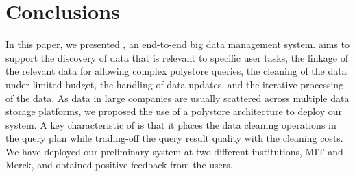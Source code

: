 \vspace{-.5em}

\section{Conclusions}
\label{sec:conclusion}

In this paper, we presented \dcv,  an end-to-end big data management system. 
\dcv aims to support  the discovery of data that is relevant to specific user tasks, 
the linkage of the relevant data for allowing complex polystore queries, 
the cleaning of the data under limited budget, 
the handling of  data updates, 
and the iterative processing of the data. 
As data in large companies are usually scattered across multiple
data storage platforms, we proposed the use of a polystore architecture to deploy our system.
A key characteristic of \dcv is that it places the data cleaning operations in the query plan
while  trading-off the query result quality with the cleaning costs. 
We have deployed our preliminary system at two different institutions, MIT and Merck, and obtained positive
feedback from the users.

\iffalse
\section{Acknowledgments}

 Michael Stonebraker contributed significantly to the work presented in this paper;
 he is precluded from being an author because of CIDR rules concerning PC chairs.
\fi

